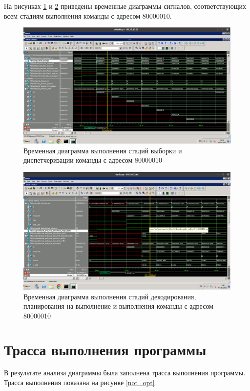 На рисунках \ref{var4task5fetch} и \ref{var4task5decode} приведены временные диаграммы сигналов, соответствующих всем стадиям выполнения команды с адресом 80000010.
\begin{figure}[h]
	\centering
	\includegraphics[width = \linewidth]{img/var4task5fetch.png}
	\caption{Временная диаграмма выполнения стадий выборки и диспетчеризации команды с адресом 80000010}
	\label{var4task5fetch}
\end{figure}

\begin{figure}[h]
	\centering
	\includegraphics[width = \linewidth]{img/var4task5decode.png}
	\caption{Временная диаграмма выполнения стадий декодирования, планирования на выполнение и выполнения команды с адресом 80000010}
	\label{var4task5decode}
\end{figure}
\newpage
\section{Трасса выполнения программы}
В результате анализа диаграммы была заполнена трасса выполнения программы. Трасса выполнения показана на рисунке \ref{not_opt} \newpage

